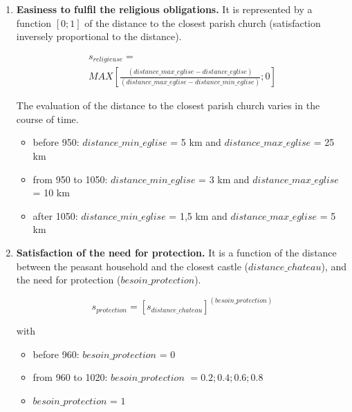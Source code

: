 \documentclass[a4paper,11pt]{article}
\begin{document}
{\begin{sloppypar}
\begin{enumerate}
with parameter \textit{coef\_redevances} equal to 15 by default and variable \textit{redevances\_acquittées} $∈ [0,n]$.

\bigskip

  \item \textbf{Easiness to fulfil the religious obligations.} It is represented by a function $[0;1]$ of the distance to the closest parish church (satisfaction inversely proportional to the distance).

\begin{small}
\begin{equation}
\begin{gathered}
s_{religieuse} =\\ MAX \left \lbrack \frac{(distance\_max\_eglise - distance\_eglise)}{(distance\_max\_eglise -distance\_min\_eglise)}; 0 \right \rbrack
\end{gathered}
\end{equation}

The evaluation of the distance to the closest parish church varies in the course of time.
\begin{itemize}
	\item before 950: $distance\_min\_eglise$ = 5 km and $distance\_max\_eglise$ =  25 km
	\item from 950 to 1050: $distance\_min\_eglise$ = 3 km and $distance\_max\_eglise$ =  10 km
	\item after 1050: $distance\_min\_eglise$ = 1,5 km and $distance\_max\_eglise$ =  5 km
\end{itemize}

\end{small}

\bigskip
  
  \item \textbf{Satisfaction of the need for protection.} It is a function of the distance between the peasant household and the closest castle ($distance\_chateau$), and the need for protection ($besoin\_protection$).

\begin{equation}
s_{protection} = [s_{distance\_chateau}]^{(besoin\_protection)}
\end{equation}

with
\begin{itemize}
	\item before 960: $besoin\_protection$ = 0
	\item from 960 to 1020: $besoin\_protection$ $= 0.2 ; 0.4 ; 0.6 ; 0.8$
	\item $besoin\_protection$ = $1$
\end{itemize}


\end{enumerate}
\end{sloppypar}}
\end{document}
